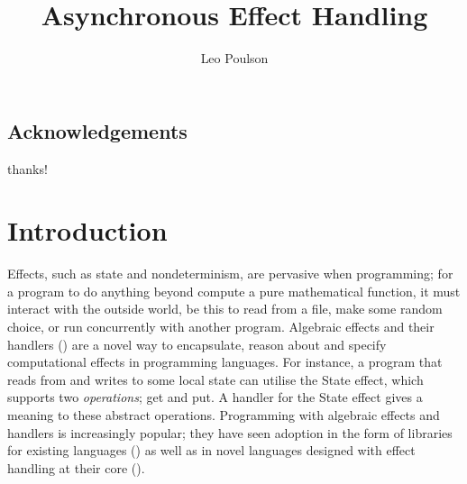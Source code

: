 \documentclass[msc,deptreport,cs]{infthesis} %
\begin{document}
\begin{preliminary}

\title{Asynchronous Effect Handling}

\author{Leo Poulson}


\maketitle

\section*{Acknowledgements}
thanks!

\tableofcontents

\end{preliminary}

\chapter{Introduction}

Effects, such as state and nondeterminism, are pervasive when programming; for a
program to do anything beyond compute a pure mathematical function, it must
interact with the outside world, be this to read from a file, make some random
choice, or run concurrently with another program. Algebraic effects and their
handlers (\cite{plotkin2013handling}) are a novel way to encapsulate, reason
about and specify computational effects in programming languages. For instance,
a program that reads from and writes to some local state can utilise the
\textsf{State} effect, which supports two \emph{operations}; \textsf{get} and
\textsf{put}. A handler for the \textsf{State} effect gives a meaning to these
abstract operations. Programming with algebraic effects and handlers is
increasingly popular; they have seen adoption in the form of libraries for
existing languages (\cite{kammar2013handlers, kiselyov2013extensible,
  brady2013programming}) as well as in novel languages designed with effect
handling at their core (\cite{bauer2015programming, leijen2017type, convent2020doo}).
\end{document}
